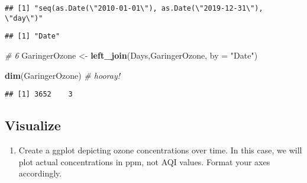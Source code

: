 \documentclass[
]{article}
\newenvironment{Shaded}{\begin{snugshade}}{\end{snugshade}}
\newcommand{\CharTok}[1]{\textcolor[rgb]{0.31,0.60,0.02}{#1}}
\newcommand{\CommentTok}[1]{\textcolor[rgb]{0.56,0.35,0.01}{\textit{#1}}}
\newcommand{\DataTypeTok}[1]{\textcolor[rgb]{0.13,0.29,0.53}{#1}}
\newcommand{\KeywordTok}[1]{\textcolor[rgb]{0.13,0.29,0.53}{\textbf{#1}}}
\newcommand{\NormalTok}[1]{#1}
\newcommand{\OperatorTok}[1]{\textcolor[rgb]{0.81,0.36,0.00}{\textbf{#1}}}
\newcommand{\StringTok}[1]{\textcolor[rgb]{0.31,0.60,0.02}{#1}}
\providecommand{\tightlist}{%
  \setlength{\itemsep}{0pt}\setlength{\parskip}{0pt}}
\begin{document}
\begin{verbatim}
## [1] "seq(as.Date(\"2010-01-01\"), as.Date(\"2019-12-31\"), \"day\")"
\end{verbatim}

\begin{Shaded}
\end{Shaded}

\begin{verbatim}
## [1] "Date"
\end{verbatim}

\begin{Shaded}
\begin{Highlighting}[]
\CommentTok{# 6}
\NormalTok{GaringerOzone <-}\StringTok{ }\KeywordTok{left_join}\NormalTok{(Days,GaringerOzone, }\DataTypeTok{by =} \StringTok{"Date"}\NormalTok{)}

\KeywordTok{dim}\NormalTok{(GaringerOzone) }\CommentTok{# hooray!}
\end{Highlighting}
\end{Shaded}

\begin{verbatim}
## [1] 3652    3
\end{verbatim}

\hypertarget{visualize}{%
\subsection{Visualize}\label{visualize}}

\begin{enumerate}
\def\labelenumi{\arabic{enumi}.}
\setcounter{enumi}{6}
\tightlist
\item
  Create a ggplot depicting ozone concentrations over time. In this
  case, we will plot actual concentrations in ppm, not AQI values.
  Format your axes accordingly.
\end{enumerate}
\end{document}
